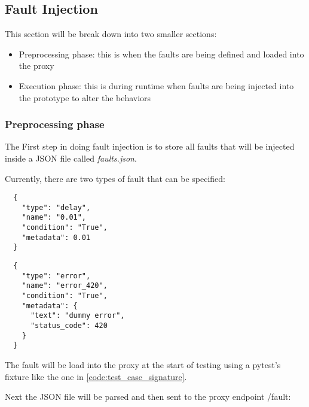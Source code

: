 \subsection{Fault Injection}
\label{subsec:fault_injection}

This section will be break down into two smaller sections:
\begin{itemize}
  \item Preprocessing phase: this is when the faults are being defined and loaded into the proxy
  \item Execution phase: this is during runtime when faults are being injected into the prototype to alter the behaviors
\end{itemize}

\subsubsection{Preprocessing phase}
\label{subsubssec:preprocessing_phase}
The First step in doing fault injection is to store all faults that will be injected 
inside a JSON file called \textit{faults.json}.

Currently, there are two types of fault that can be specified:

\begin{multicols}{2}
  \begin{listing}[H]
    
  \begin{verbatim}
  {
    "type": "delay",
    "name": "0.01",
    "condition": "True",
    "metadata": 0.01
  }
  \end{verbatim}
  \caption{Delay type fault}
  \label{code:json_delay}
\end{listing}

  \columnbreak

  \begin{listing}[H]
  \begin{verbatim}
  {
    "type": "error",
    "name": "error_420",
    "condition": "True",
    "metadata": {
      "text": "dummy error",
      "status_code": 420
    }
  }
  \end{verbatim}
  \caption{Error type fault}
  \label{code:json_error}
\end{listing}
\end{multicols}

The fault will be load into the proxy at the start of testing using a pytest's 
fixture like the one in \ref{code:test_case_signature}.

Next the JSON file will be parsed and then sent to the proxy endpoint /fault:

